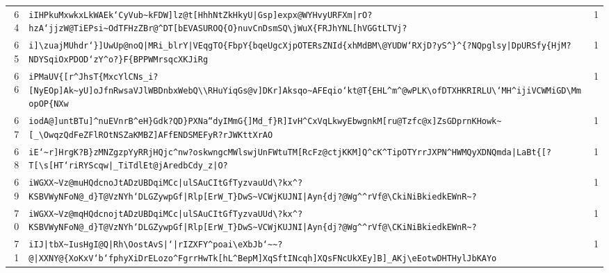 \begin{xltabular}{\textwidth}{@{} r >{\raggedright\arraybackslash}X r @{}}
        64 & \texttt{iIHPkuMxwkxLkWAEk`CyVub\textasciitilde{}kFDW]lz@t[HhhNtZkHkyU|Gsp]expx@WYHvyURFXm|rO?hzA`jjzW@TiEPsi\textasciitilde{}OdTFHzZBr@\textasciicircum{}DT[bEVASUROQ\{O\}nuvCnDsmSQ\textbackslash{}jWuX\{FRJhYNL[hVGGtLTVj?} & 1 \\
        65 & \texttt{i]\textbackslash{}zuajMUhdr`\}]UwUp@noQ|MRi\_blrY|VEqgTO\{FbpY\{bqeUgcXjpOTERsZNId\{xhMdBM\textbackslash{}@YUDW`RXjD?yS\textasciicircum{}\}\textasciicircum{}\{?NQpglsy|DpURSfy\{HjM?NDYSqiOxPDOD`zY\textasciicircum{}o?\}F\{BPPWMrsqcXKJiRg} & 1 \\
        66 & \texttt{iPMaUV\{[r\textasciicircum{}JhsT\{MxcYlCNs\_i?[NyEOp]Ak\textasciitilde{}yU]oJfnRwsaVJlWBDnbxWebQ\textbackslash{}\textbackslash{}RHuYiqGs@v]DKr]Aksqo\textasciitilde{}AFEqio`kt@T\{EHL\textasciicircum{}m\textasciicircum{}@wPLK\textbackslash{}ofDTXHKRIRLU\textbackslash{}`MH\textasciicircum{}ijiVCWMiGD\textbackslash{}MmopOP\{NXw} & 1 \\
        67 & \texttt{iodA@]untBTu]\textasciicircum{}nuEVnrB\textasciicircum{}eH\}Gdk?QD\}PXNa``dyIMmG\{]Md\_f\}R]IvH\textasciicircum{}CxVqLkwyEbwgnkM[ru@Tzfc@x]ZsGDprnKHowk\textasciitilde{}[\_\textbackslash{}OwqzQdFeZFlROtNSZaKMBZ]AFfENDSMEFyR?rJWKttXrAO} & 1 \\
        68 & \texttt{iE`\textasciitilde{}r]HrgK?B\}zMNZgzpYyRRjHQjc\textasciicircum{}nw?oskwngcMWlswjUnFWtuTM[RcFz@ctjKKM]Q\textasciicircum{}cK\textasciicircum{}TipOTYrrJXPN\textasciicircum{}HWMQyXDNQmda|LaBt\{[?T[\textbackslash{}s[HT`riRYScqw|\_TiTdlEt@jAredbCdy\_z|O?} & 1 \\
        69 & \texttt{iWGXX\textasciitilde{}Vz@muHQdcnoJtADzUBDqiMCc|ulSAuCItGfTyzvauUd\textbackslash{}?kx\textasciicircum{}?KSBVWyNFoN@\_d\}T@VzNYh`DLGZywpGf|Rlp[ErW\_T\}DwS\textasciitilde{}VCWjKUJNI|Ayn\{dj?@Wg\textasciicircum{}\textasciicircum{}rVf@\textbackslash{}CkiNiBkiedkEWnR\textasciitilde{}?} & 1 \\
        70 & \texttt{iWGXX\textasciitilde{}Vz@mqHQdcnojtADzUBDqiMCc|ulSAuCItGfTyzvaUUd\textbackslash{}?kx\textasciicircum{}?KSBVWyNFoN@\_d\}T@VzNYh`DLGZywpGf|Rlp[ErW\_T\}DwS\textasciitilde{}VCWjKUJNI|Ayn\{dj?@Wg\textasciicircum{}\textasciicircum{}rVf@\textbackslash{}CKiNiBkiedkEWnR\textasciitilde{}?} & 1 \\
        71 & \texttt{iIJ|tbX\textasciitilde{}IusHgI@Q|Rh\textbackslash{}OostAvS|`|rIZXFY\textasciicircum{}poai\textbackslash{}eXbJb`\textasciitilde{}\textasciitilde{}?@|XXNY@\{XoKxV`b`fphyXiDrELozo\textasciicircum{}FgrrHwTk[hL\textasciicircum{}BepM]XqSftINcqh]XQsFNcUkXEy]B]\_AKj\textbackslash{}eEotwDHTHylJbKAYo} & 1 \\

\end{xltabular}
